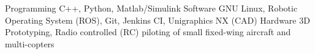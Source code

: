 

\begin{cvskills}

\vspace{-4pt}
  \cvskill
    {Programming} %
    {C++, Python, Matlab/Simulink} %
    \vspace{-4pt}
  \cvskill
    {Software} %
    {GNU Linux, Robotic Operating System (ROS), Git, Jenkins CI, Unigraphics NX (CAD)} %
    \vspace{-4pt}
  \cvskill
    {Hardware}
    {3D Prototyping, Radio controlled (RC) piloting of small fixed-wing aircraft and multi-copters}


\end{cvskills}
